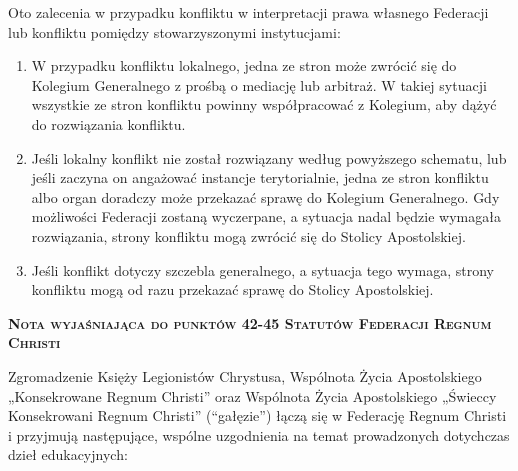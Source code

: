 

 Oto zalecenia w przypadku konfliktu w interpretacji prawa własnego Federacji lub konfliktu pomiędzy stowarzyszonymi instytucjami:


\begin{enumerate}


\item W przypadku konfliktu lokalnego, jedna ze stron może zwrócić się do Kolegium Generalnego z prośbą o mediację lub arbitraż. W takiej sytuacji wszystkie ze stron konfliktu powinny współpracować z Kolegium, aby dążyć do rozwiązania konfliktu.


\item Jeśli lokalny konflikt nie został rozwiązany według powyższego schematu, lub jeśli zaczyna on angażować instancje terytorialnie, jedna ze stron konfliktu albo organ doradczy może przekazać sprawę do Kolegium Generalnego. Gdy możliwości Federacji zostaną wyczerpane, a sytuacja nadal będzie wymagała rozwiązania, strony konfliktu mogą zwrócić się do Stolicy Apostolskiej.


\item Jeśli konflikt dotyczy szczebla generalnego, a sytuacja tego wymaga, strony konfliktu mogą od razu przekazać sprawę do Stolicy Apostolskiej.


\end{enumerate}
 
 


\newpage
{}
{\large\bf\textsc{Nota wyjaśniająca do punktów 42-45 Statutów Federacji Regnum Christi}}
 
Zgromadzenie Księży Legionistów Chrystusa, Wspólnota Życia Apostolskiego „Konsekrowane Regnum Christi” oraz Wspólnota Życia Apostolskiego „Świeccy Konsekrowani Regnum Christi” (“gałęzie”) łączą się w Federację Regnum Christi i przyjmują następujące, wspólne uzgodnienia na temat prowadzonych dotychczas dzieł edukacyjnych:


